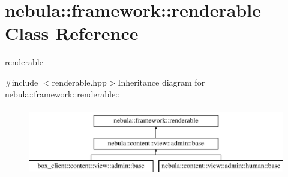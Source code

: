 \hypertarget{classnebula_1_1framework_1_1renderable}{
\section{nebula::framework::renderable Class Reference}
\label{classnebula_1_1framework_1_1renderable}
}


\hyperlink{classnebula_1_1framework_1_1renderable}{renderable}  


{\ttfamily \#include $<$renderable.hpp$>$}Inheritance diagram for nebula::framework::renderable::\begin{figure}[H]
\begin{center}
\leavevmode
\includegraphics[height=3cm]{classnebula_1_1framework_1_1renderable}
\end{center}
\end{figure}
